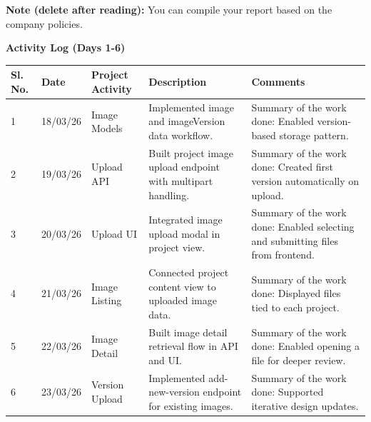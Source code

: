 \documentclass[12pt,a4paper]{article}
\begin{document}
{\color{red}\small\textbf{Note (delete after reading):} You can compile your report based on the company policies.}
\vspace{0.25cm}
\begin{center}{\large\bfseries Activity Log (Days 1-6)}\end{center}
\begin{tabular}{|p{}|p{}|p{}|p{}|p{}|}\hline
\centering\textbf{Sl. No.} & \centering\textbf{Date} & \centering\textbf{Project Activity} & \centering\textbf{Description} & \centering\textbf{Comments} \tabularnewline\hline
1 & 18/03/26 & Image Models & Implemented image and imageVersion data workflow. &
Summary of the work done:\newline
Enabled version-based storage pattern. \\ \hline
2 & 19/03/26 & Upload API & Built project image upload endpoint with multipart handling. &
Summary of the work done:\newline
Created first version automatically on upload. \\ \hline
3 & 20/03/26 & Upload UI & Integrated image upload modal in project view. &
Summary of the work done:\newline
Enabled selecting and submitting files from frontend. \\ \hline
4 & 21/03/26 & Image Listing & Connected project content view to uploaded image data. &
Summary of the work done:\newline
Displayed files tied to each project. \\ \hline
5 & 22/03/26 & Image Detail & Built image detail retrieval flow in API and UI. &
Summary of the work done:\newline
Enabled opening a file for deeper review. \\ \hline
6 & 23/03/26 & Version Upload & Implemented add-new-version endpoint for existing images. &
Summary of the work done:\newline
Supported iterative design updates. \\ \hline
\end{tabular}

\newpage
\end{document}
